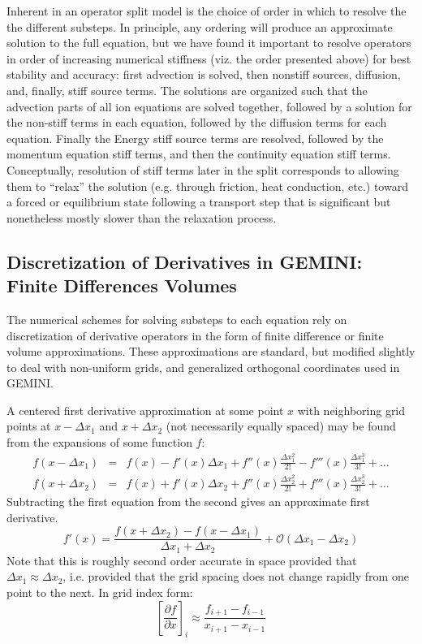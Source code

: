 \documentclass[11pt,letterpaper]{article}
\begin{document}
Inherent in an operator split model is the choice of order in which to resolve the the different substeps.  In principle, any ordering will produce an approximate solution to the full equation, but we have found it important to resolve operators in order of increasing numerical stiffness (viz. the order presented above) for best stability and accuracy:  first advection is solved, then nonstiff sources, diffusion, and, finally, stiff source terms.  The solutions are organized such that the advection parts of all ion equations are solved together, followed by a solution for the non-stiff terms in each equation, followed by the diffusion terms for each equation.  Finally the Energy stiff source terms are resolved, followed by the momentum equation stiff terms, and then the continuity equation stiff terms.  Conceptually, resolution of stiff terms later in the split corresponds to allowing them to ``relax'' the solution (e.g. through friction, heat conduction, etc.) toward a forced or equilibrium state following a transport step that is significant but nonetheless mostly slower than the relaxation process.


\subsection{Discretization of Derivatives in GEMINI:  Finite Differences Volumes}

The numerical schemes for solving substeps to each equation rely on discretization of derivative operators in the form of finite difference or finite volume approximations.  These approximations are standard, but modified slightly to deal with non-uniform grids, and generalized orthogonal coordinates used in GEMINI.

A centered first derivative approximation at some point $x$ with neighboring grid points at $x-\Delta x_1$ and $x+\Delta x_2$ (not necessarily equally spaced) may be found from the expansions of some function $f$:
\begin{eqnarray}
f(x-\Delta x_1) &=& f(x) - f'(x)\Delta x_1 + f''(x) \frac{\Delta x_1^2}{2!} - f'''(x) \frac{\Delta x_1^3}{3!} + \dots \nonumber \\
f(x+\Delta x_2) &=& f(x) + f'(x)\Delta x_2 + f''(x) \frac{\Delta x_2^2}{2!} + f'''(x) \frac{\Delta x_2^3}{3!} + \dots \nonumber
\end{eqnarray}
Subtracting the first equation from the second gives an approximate first derivative.
\begin{equation}
f'(x) = \frac{f(x+\Delta x_2) - f(x-\Delta x_1)}{\Delta x_1+\Delta x_2} + \mathcal{O}(\Delta x_1-\Delta x_2) \label{1stderiv}
\end{equation}
Note that this is roughly second order accurate in space provided that $\Delta x_1 \approx \Delta x_2$, i.e. provided that the grid spacing does not change rapidly from one point to the next.  In grid index form:
\begin{equation}
\left[ \frac{\partial f}{\partial x} \right]_i \approx \frac{f_{i+1} - f_{i-1}}{x_{i+1} - x_{i-1}}
\end{equation}
\end{document}
